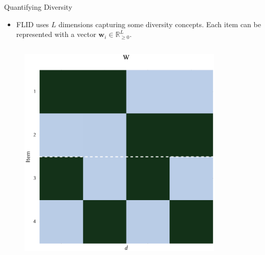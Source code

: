 \documentclass{beamer}
\begin{document}
\begin{frame}{Quantifying Diversity}
  \begin{itemize}
    \item FLID uses $L$ dimensions capturing some diversity concepts. Each item can be represented with a vector $\mathbf{w}_{i} \in \mathbb{R}^{L}_{\geq 0}$.
  \end{itemize}
  \begin{columns}
    \begin{column}{0.45\textwidth}
      \begin{figure}
        \centering
        \includegraphics[width=\textwidth]{fldc_toy_example_diversity_weights}
      \end{figure}
    \end{column}
    \begin{column}{0.45\textwidth}
      \begin{figure}
        \centering

\end{figure}
\end{column}
\end{columns}
\end{frame}
\end{document}
